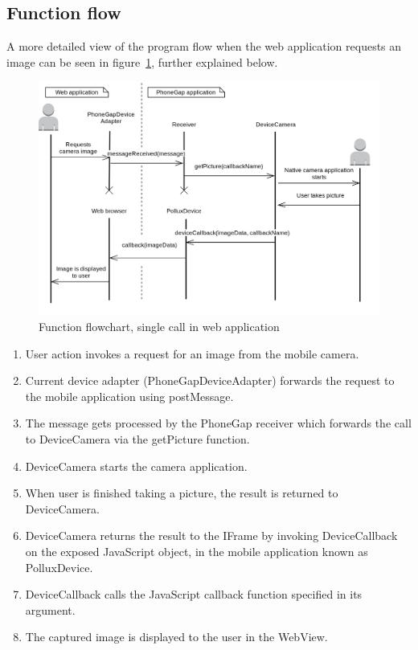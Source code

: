 \subsection{Function flow}\label{subsec:function-flow-phonegap}
A more detailed view of the program flow when the web application requests an image can be seen in figure~\ref{fig:phonegapflow}, further explained below.
\begin{figure}[h!]
	\centering
    \includegraphics[width=120mm,natwidth=800,natheight=600]{./img/phonegapfunctionflow.png}
    \caption{Function flowchart, single call in web application \label{fig:phonegapflow}}
\end{figure}
\begin{enumerate}
	\item User action invokes a request for an image from the mobile camera. 
	\item Current device adapter (PhoneGapDeviceAdapter) forwards the request to the mobile application using postMessage.
	\item The message gets processed by the PhoneGap receiver which forwards the call to DeviceCamera via the getPicture function.
	\item DeviceCamera starts the camera application.
	\item When user is finished taking a picture, the result is returned to DeviceCamera.
	\item DeviceCamera returns the result to the IFrame by invoking DeviceCallback on the exposed JavaScript object, in the mobile application known as PolluxDevice.
	\item DeviceCallback calls the JavaScript callback function specified in its argument.
	\item The captured image is displayed to the user in the WebView.
\end{enumerate}


